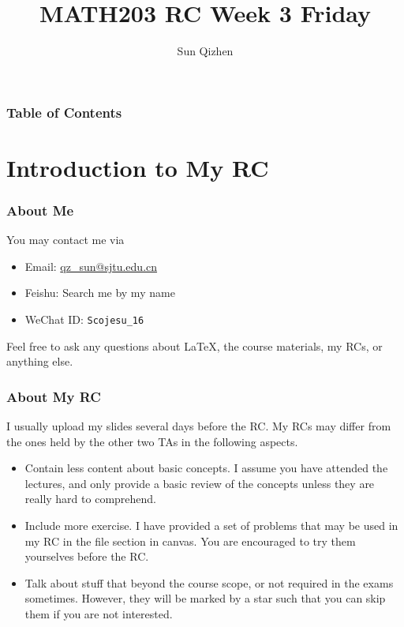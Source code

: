 \documentclass[aspectratio=169]{beamer}
\title[Course number]{MATH203 RC Week 3 Friday}
\author[]{Sun Qizhen}
\institute[UMJI-SJTU]
{
	University of Michigan - Shanghai Jiaotong University
	\\\medskip
	Joint Institute
}
\begin{document}
\maketitle
\begin{frame}
  \frametitle{Table of Contents}
  \tableofcontents
\end{frame}
\section{Introduction to My RC}

\begin{frame}
  \frametitle{About Me}
  You may contact me via
  \begin{itemize}
    \item Email: \href{mailto:qz_sun@sjtu.edu.cn}{qz\_sun@sjtu.edu.cn}
    \item Feishu: Search me by my name
    \item WeChat ID: \texttt{Scojesu\_16}
  \end{itemize}
  Feel free to ask any questions about \LaTeX, the course materials, my RCs, or anything else.

\end{frame}
\begin{frame}
  \frametitle{About My RC}
  I usually upload my slides several days before the RC. My RCs may differ from the ones held by the other
  two TAs in the following aspects. 
  \begin{itemize}
    \item Contain less content about basic concepts. I assume you have attended the lectures, and only provide a basic review of the 
    concepts unless they are really hard to comprehend.
    \item Include more exercise. I have provided a set of problems that may be used in my RC in the file section in canvas.
    You are encouraged to try them yourselves before the RC.
    \item Talk about stuff that beyond the course scope, or not required in the exams sometimes. However, they will be marked by a star 
    such that you can skip them if you are not interested.
  \end{itemize}
\end{frame}
\end{document}
